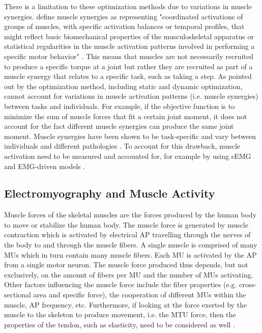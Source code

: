 There is a limitation to these optimization methods due to variations in muscle synergies.
\textcite{Ivanenko2016} define muscle synergies as representing "coordinated activations of groups of muscles, with specific activation balances or temporal profiles, that might reflect basic biomechanical properties of the musculoskeletal apparatus or statistical regularities in the muscle activation patterns involved in performing a specific motor behavior" \parencite[160]{Ivanenko2016}.
This means that muscles are not necessarily recruited to produce a specific torque at a joint but rather they are recruited as part of a muscle synergy that relates to a specific task, such as taking a step.
As pointed out by \textcite{Pizzolato2015} the optimization method, including static and dynamic optimization, cannot account for variations in muscle activation patterns (i.e. muscle synergies) between tasks and individuals.
For example, if the objective function is to minimize the sum of muscle forces that fit a certain joint moment, it does not account for the fact different muscle synergies can produce the same joint moment. 
Muscle synergies have been shown to be task-specific and vary between individuals and different pathologies \cite{Ivanenko2016, Safavynia2011}.
To account for this drawback, muscle activation need to be measured and accounted for, for example by using \ac{sEMG} and \ac{EMG}-driven models \cite{Pizzolato2015}.

\subsection{Electromyography and Muscle Activity}
\label{sec:A-EMG}
Muscle forces of the skeletal muscles are the forces produced by the human body to move or stabilize the human body. 
The muscle force is generated by muscle contraction which is activated by electrical \ac{AP} travelling through the nerves of the body to and through the muscle fibers. 
A single muscle is comprised of many \acp{MU} which in turn contain many muscle fibers.
Each \ac{MU} is activated by the \ac{AP} from a single motor neuron.
The muscle force produced thus depends, but not exclusively, on the amount of fibers per \ac{MU} and the number of \acp{MU} activating.
Other factors influencing the muscle force include the fiber properties (e.g. cross-sectional area and specific force), the cooperation of different \acp{MU} within the muscle, \ac{AP} frequency, etc.
Furthermore, if looking at the force exerted by the muscle to the skeleton to produce movement, i.e. the \ac{MTU} force, then the properties of the tendon, such as elasticity, need to be considered as well \cite{Pizzolato2015, Enoka2016, Farina2016}. 

